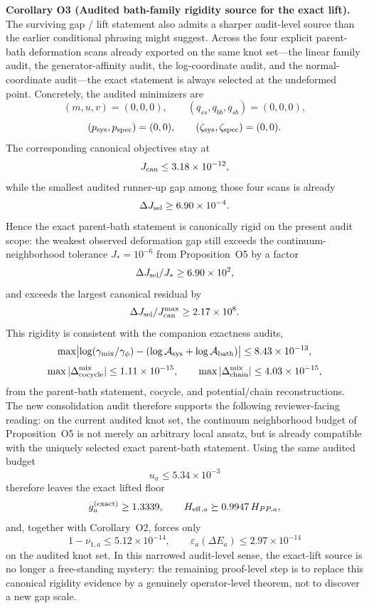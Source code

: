 \documentclass[aps,prd,onecolumn,notitlepage,nofootinbib,superscriptaddress,11pt,floatfix]{revtex4-2}
\begin{document}
\medskip\noindent\textbf{Corollary O3 (Audited bath-family rigidity source for the exact lift).}
The surviving gap / lift statement also admits a sharper audit-level source than the earlier conditional phrasing might suggest. Across the four explicit parent-bath deformation scans already exported on the same knot set---the linear family audit, the generator-affinity audit, the log-coordinate audit, and the normal-coordinate audit---the exact statement is always selected at the undeformed point. Concretely, the audited minimizers are
\[
(m,u,v)=(0,0,0),
\qquad
(q_{ss},q_{bb},q_{sb})=(0,0,0),
\]
\[
(p_{\rm sys},p_{\rm spec})=(0,0),
\qquad
(\zeta_{\rm sys},\zeta_{\rm spec})=(0,0).
\]
The corresponding canonical objectives stay at
\[
J_{\rm can}\le 3.18\times10^{-12},
\]
while the smallest audited runner-up gap among those four scans is already
\[
\Delta J_{\rm sel}\ge 6.90\times10^{-4}.
\]
Hence the exact parent-bath statement is canonically rigid on the present audit scope: the weakest observed deformation gap still exceeds the continuum-neighborhood tolerance $J_\ast=10^{-6}$ from Proposition~O5 by a factor
\[
\Delta J_{\rm sel}/J_\ast \ge 6.90\times10^{2},
\]
and exceeds the largest canonical residual by
\[
\Delta J_{\rm sel}/J_{\rm can}^{\max}\ge 2.17\times10^{8}.
\]
This rigidity is consistent with the companion exactness audits,
\[
\max\bigl|\log(\gamma_{\rm mix}/\gamma_\phi)-(\log\mathcal A_{\rm sys}+\log\mathcal A_{\rm bath})\bigr|
\le 8.43\times10^{-13},
\]
\[
\max |\Delta_{\rm cocycle}^{\rm mix}|\le 1.11\times10^{-15},
\qquad
\max |\Delta_{\rm chain}^{\rm mix}|\le 4.03\times10^{-15},
\]
from the parent-bath statement, cocycle, and potential/chain reconstructions. The new consolidation audit  therefore supports the following reviewer-facing reading: on the current audited knot set, the continuum neighborhood budget of Proposition~O5 is not merely an arbitrary local ansatz, but is already compatible with the uniquely selected exact parent-bath statement. Using the same audited budget
\[
u_a\le 5.34\times10^{-3}
\]
therefore leaves the exact lifted floor
\[
g_a^{\rm(exact)}\ge 1.3339,
\qquad
H_{{\rm eff},a}\succeq 0.9947\,H_{PP,a},
\]
and, together with Corollary~O2, forces only
\[
1-\nu_{1,a}\le 5.12\times10^{-14},
\qquad
\varepsilon_a(\Delta E_a)\le 2.97\times10^{-14}
\]
on the audited knot set. In this narrowed audit-level sense, the exact-lift source is no longer a free-standing mystery: the remaining proof-level step is to replace this canonical rigidity evidence by a genuinely operator-level theorem, not to discover a new gap scale.
\end{document}
